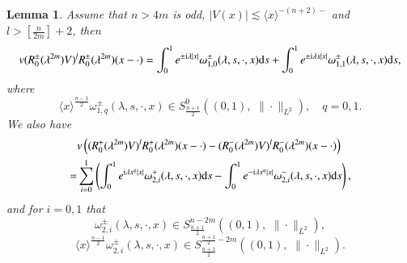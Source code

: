 \documentclass[11pt,reqno]{amsart}
\def\d{{\rm d}}
\def\i{{\rm i}}
\newtheorem{lemma}[theorem]{Lemma}
\numberwithin{equation}{section}
\theoremstyle{definition}
\begin{document}
\begin{lemma}\label{lemma4.9}
	Assume that $n>4m$ is odd, $|V(x)|\lesssim\langle x\rangle^{-(n+2)-}$ and   $l>[\frac{n}{2m}]+2$, then
	\begin{equation}\label{eq4.62}
		v(R_{0}^{\pm}(\lambda^{2m})V)^{l}R_{0}^{\pm}(\lambda^{2m})(x-\cdot)
		=\int_{0}^{1}e^{\pm \i\lambda|x|}\omega_{1,0}^{\pm}(\lambda,s,\cdot,x)\d s+\int_{0}^{1}e^{\pm \i\lambda s|x|}\omega_{1,1}^{\pm}(\lambda,s,\cdot,x)\d s,
	\end{equation}
	where
	\begin{equation}\label{eq4.62.1}
		\langle x\rangle^{\frac{n-1}{2}}\omega_{1,q}^{\pm}(\lambda,s,\cdot,x)\in S_{\frac{n+1}{2}}^{0}((0,1),\,\, \|\cdot \|_{L^{2}} ),\quad q=0,1.
	\end{equation}
	We also have
	\begin{equation}\label{eq4.63}
		\begin{split}
			&v\left((R_{0}^{+}(\lambda^{2m})V)^{l}R_{0}^{+}(\lambda^{2m})(x-\cdot)-(R_{0}^{-}(\lambda^{2m})V)^{l}R_{0}^{-}(\lambda^{2m})(x-\cdot)\right) \\
			=&\sum_{i=0}^1\left(\int_{0}^{1}e^{\i\lambda s^q|x|}\omega_{2,i}^{+}(\lambda,s,\cdot,x)\d s-\int_{0}^{1}e^{-\i\lambda s^q|x|}\omega_{2,i}^{-}(\lambda,s,\cdot,x)\d s\right),
		\end{split}
	\end{equation}
	and for $i=0,1$ that
	\begin{equation}\label{eq4.63.2}
		\omega_{2,i}^{\pm}(\lambda,s,\cdot,x)\in S_{\frac{n+1}{2}}^{n-2m}((0,1),\,\, \|\cdot \|_{L^{2}} ),
	\end{equation}
	\begin{equation}\label{eq4.63.1}
		\langle x\rangle^{\frac{n-1}{2}}\omega_{2,i}^{\pm}(\lambda,s,\cdot,x)\in S_{\frac{n+1}{2}}^{\frac{n+1}{2}-2m}((0,1),\,\, \|\cdot \|_{L^{2}}).
	\end{equation}
\end{lemma}
\end{document}
